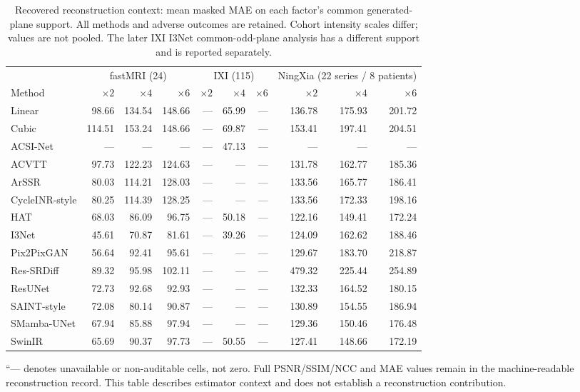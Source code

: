 \begin{table}[t]
\caption{Recovered reconstruction context: mean masked MAE on each factor's common generated-plane support. All methods and adverse outcomes are retained. Cohort intensity scales differ; values are not pooled. The later IXI I3Net common-odd-plane analysis has a different support and is reported separately.}
\label{tab:arch-benchmark}\centering
\small
\setlength{\tabcolsep}{4pt}
\begin{tabular}{lrrrrrrrrr}
\toprule
&\multicolumn{3}{c}{fastMRI (24)}&\multicolumn{3}{c}{IXI (115)}&\multicolumn{3}{c}{NingXia (22 series / 8 patients)}\\
Method&$\times2$&$\times4$&$\times6$&$\times2$&$\times4$&$\times6$&$\times2$&$\times4$&$\times6$\\
\midrule
Linear & 98.66 & 134.54 & 148.66 & --- & 65.99 & --- & 136.78 & 175.93 & 201.72 \\
Cubic & 114.51 & 153.24 & 148.66 & --- & 69.87 & --- & 153.41 & 197.41 & 204.51 \\
ACSI-Net & --- & --- & --- & --- & 47.13 & --- & --- & --- & --- \\
ACVTT & 97.73 & 122.23 & 124.63 & --- & --- & --- & 131.78 & 162.77 & 185.36 \\
ArSSR & 80.03 & 114.21 & 128.03 & --- & --- & --- & 133.56 & 165.77 & 186.41 \\
CycleINR-style & 80.25 & 114.39 & 128.25 & --- & --- & --- & 133.56 & 172.33 & 198.16 \\
HAT & 68.03 & 86.09 & 96.75 & --- & 50.18 & --- & 122.16 & 149.41 & 172.24 \\
I3Net & 45.61 & 70.87 & 81.61 & --- & 39.26 & --- & 124.09 & 162.62 & 188.46 \\
Pix2PixGAN & 56.64 & 92.41 & 95.61 & --- & --- & --- & 129.67 & 183.70 & 218.87 \\
Res-SRDiff & 89.32 & 95.98 & 102.11 & --- & --- & --- & 479.32 & 225.44 & 254.89 \\
ResUNet & 72.73 & 92.68 & 92.93 & --- & --- & --- & 132.33 & 164.52 & 180.15 \\
SAINT-style & 72.08 & 80.14 & 90.87 & --- & --- & --- & 130.89 & 154.55 & 186.94 \\
SMamba-UNet & 67.94 & 85.88 & 97.94 & --- & --- & --- & 129.36 & 150.46 & 176.48 \\
SwinIR & 65.69 & 90.37 & 97.73 & --- & 50.55 & --- & 127.41 & 148.66 & 172.19 \\
\bottomrule
\end{tabular}
\par\smallskip\parbox{\textwidth}{\footnotesize ``--- denotes unavailable or non-auditable cells, not zero. Full PSNR/SSIM/NCC and MAE values remain in the machine-readable reconstruction record. This table describes estimator context and does not establish a reconstruction contribution.}
\end{table}
